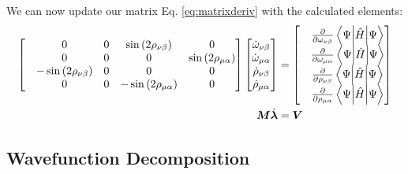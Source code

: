 \documentclass{aux/ttuthes2007}
\newcommand{\sandwich}[3]{\left< #1 \middle\vert #2 \middle\vert #3 \right>}
\newcommand{\s}[1]{\sin\left( #1 \right)}
\newcommand{\pd}[1]{\frac{\partial}{\partial #1}}
\newcommand{\ind}[1]{{\uo #1 \oo #1}}
\newcommand{\uo}[1]{
		\IfEqCase{#1}{
			{0}{\mu}
			{1}{\nu}
			{2}{\xi}
		}[\PackageError{uo}{Undefined option to uo: #1}{}]
}
\newcommand{\oo}[1]{
		\IfEqCase{#1}{
			{0}{\alpha}
			{1}{\beta}
			{2}{\gamma}
		}[\PackageError{unocorb}{Undefined option to unuo: #1}{}]
}
\begin{document}
We can now update our matrix Eq. \ref{eq:matrixderiv} with the calculated elements:
\begin{equation*}
\begin{split}
	\label {eq:matrixrw}
	\begin{bmatrix}
		& 0
		& 0
		& \s {2\rho_\ind 1}
		& 0
		\\
		& 0
		& 0
		& 0
		& \s {2\rho_\ind 0}
		\\
		& -\s {2\rho_\ind 1}
		& 0
		& 0
		& 0
		\\
		& 0
		& 0
		& -\s {2\rho_\ind 0}
		& 0
		\\
	\end{bmatrix}
	\begin{bmatrix}
		\dot \omega_\ind 1 \\
		\dot \omega_\ind 0 \\
		\dot \rho_\ind 1 \\
		\dot \rho_\ind 0 \\
	\end{bmatrix}
	&= 
	\begin{bmatrix}
	&\pd{\omega_\ind 1}\sandwich{\Psi}{\hat H}{\Psi} \\
	&\pd{\omega_\ind 0}\sandwich{\Psi}{\hat H}{\Psi} \\
	&\pd{\rho_\ind 1}\sandwich{\Psi}{\hat H}{\Psi} \\
	&\pd{\rho_\ind 0}\sandwich{\Psi}{\hat H}{\Psi} \\
	\end{bmatrix}\\
	\bm M \dot {\bm \lambda} &= \bm V
\end{split}
\end{equation*}

\subsection {\textbf{Wavefunction Decomposition}}
\end{document}
